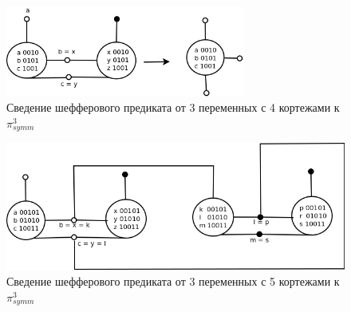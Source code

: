 \documentclass[12pt]{extarticle}
\begin{document}
\begin{figure}[htb]
 \centering
\includegraphics[width=0.7\textwidth]{sch4.png}
\caption{Сведение шефферового предиката от 3 переменных с 4 кортежами к $\pi_{symm}^3$ }
\label{fig:sheff4tosheff3}
\end{figure}

\begin{figure}[htb]
 \centering
\includegraphics[width=1.0\textwidth]{sch5.png}
\caption{Сведение шефферового предиката от 3 переменных с 5 кортежами к $\pi_{symm}^3$ }
\label{fig:sheff5tosheff3}
\end{figure}


\end{document}
